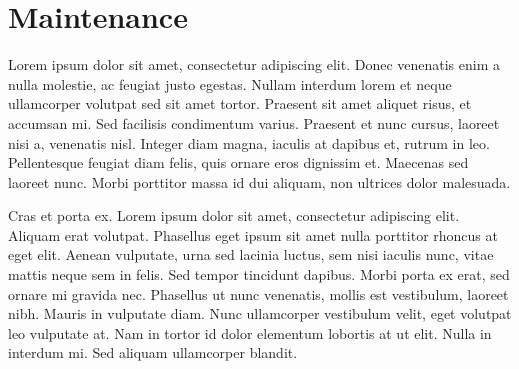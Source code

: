 \documentclass[12pt, a4paper, oneside]{book}
\begin{document}
\section{Maintenance}


Lorem ipsum dolor sit amet, consectetur adipiscing elit. Donec venenatis enim a nulla molestie, ac feugiat justo egestas. Nullam interdum lorem et neque ullamcorper volutpat sed sit amet tortor. Praesent sit amet aliquet risus, et accumsan mi. Sed facilisis condimentum varius. Praesent et nunc cursus, laoreet nisi a, venenatis nisl. Integer diam magna, iaculis at dapibus et, rutrum in leo. Pellentesque feugiat diam felis, quis ornare eros dignissim et. Maecenas sed laoreet nunc. Morbi porttitor massa id dui aliquam, non ultrices dolor malesuada.

Cras et porta ex. Lorem ipsum dolor sit amet, consectetur adipiscing elit. Aliquam erat volutpat. Phasellus eget ipsum sit amet nulla porttitor rhoncus at eget elit. Aenean vulputate, urna sed lacinia luctus, sem nisi iaculis nunc, vitae mattis neque sem in felis. Sed tempor tincidunt dapibus. Morbi porta ex erat, sed ornare mi gravida nec. Phasellus ut nunc venenatis, mollis est vestibulum, laoreet nibh. Mauris in vulputate diam. Nunc ullamcorper vestibulum velit, eget volutpat leo vulputate at. Nam in tortor id dolor elementum lobortis at ut elit. Nulla in interdum mi. Sed aliquam ullamcorper blandit.
\end{document}
